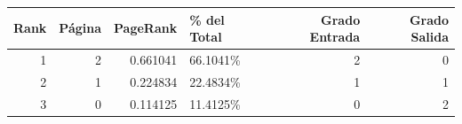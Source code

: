 \begin{tabular}{rrrlrr}
\toprule
   Rank &   Página &   PageRank & \% del Total   &   Grado Entrada &   Grado Salida \\
\midrule
      1 &        2 &   0.661041 & 66.1041\%      &               2 &              0 \\
      2 &        1 &   0.224834 & 22.4834\%      &               1 &              1 \\
      3 &        0 &   0.114125 & 11.4125\%      &               0 &              2 \\
\bottomrule
\end{tabular}